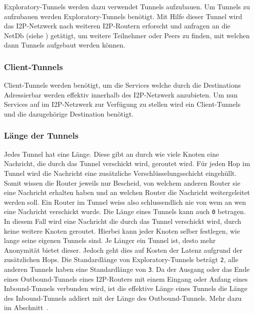 Exploratory-Tunnels werden dazu verwendet Tunnels aufzubauen.
Um Tunnels zu aufzubauen werden Exploratory-Tunnels benötigt.
Mit Hilfe dieser Tunnel wird das I2P-Netzwerk nach weiteren I2P-Routern erforscht und anfragen an die NetDb (siehe ) getätigt,
um weitere Teilnehmer oder Peers zu finden, mit welchen dann Tunnels aufgebaut werden können.
\cite{de_boer_invisible_2019}

\subsubsection{Client-Tunnels}

Client-Tunnels werden benötigt, um die Services welche durch die Destinations Adressierbar werden effektiv innerhalb des I2P-Netzwerk anzubieten.
Um nun Services auf im I2P-Netzwerk zur Verfügung zu stellen wird ein Client-Tunnels und die dazugehörige Destination benötigt.

\subsubsection{Länge der Tunnels}

Jedes Tunnel hat eine Länge.
Diese gibt an durch wie viele Knoten eine Nachricht, die durch das Tunnel verschickt wird, geroutet wird.
Für jeden Hop im Tunnel wird die Nachricht eine zusätzliche Verschlüsselungsschicht eingehüllt.
Somit wissen die Router jeweils nur Bescheid, von welchem anderen Router sie eine Nachricht erhalten haben und an welchen Router die Nachricht weitergeleitet werden soll.
Ein Router im Tunnel weiss also schlussendlich nie von wem an wen eine Nachricht verschickt wurde.
Die Länge eines Tunnels kann auch \lstinline|0| betragen.
In diesem Fall wird eine Nachricht die durch das Tunnel verschickt wird, durch keine weitere Knoten geroutet.
Hierbei kann jeder Knoten selber festlegen, wie lange seine eigenen Tunnels sind.
Je Länger ein Tunnel ist, desto mehr Anonymität bietet dieser.
Jedoch geht dies auf Kosten der Latenz aufgrund der zusätzlichen Hops.
Die Standardlänge von Exploratory-Tunnels beträgt \lstinline|2|, alle anderen Tunnels haben eine Standardlänge von \lstinline|3|.
Da der Ausgang oder das Ende eines Outbound-Tunnels eines I2P-Routers mit einem Eingang oder Anfang eines Inbound-Tunnels verbunden wird,
ist die effektive Länge eines Tunnels die Länge des Inbound-Tunnels addiert mit der Länge des Outbound-Tunnels. Mehr dazu im Abschnitt~.
\cite{noauthor_i2p_nodate-3}

